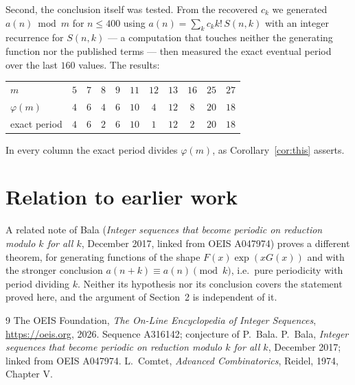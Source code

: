 \documentclass[11pt,a4paper]{article}
\theoremstyle{plain}
\theoremstyle{definition}
\begin{document}
Second, the conclusion itself was tested. From the recovered $c_{k}$ we generated
$a(n)\bmod m$ for $n\le400$ using $a(n)=\sum_{k}c_{k}k!\,S(n,k)$ with an integer
recurrence for $S(n,k)$ --- a computation that touches neither the generating function nor
the published terms --- then measured the exact eventual period over the last $160$
values. The results:

\begin{center}
\begin{tabular}{@{}lcccccccccc@{}}
\toprule
$m$  & $5$ & $7$ & $8$ & $9$ & $11$ & $12$ & $13$ & $16$ & $25$ & $27$\\
$\varphi(m)$  & $4$ & $6$ & $4$ & $6$ & $10$ & $4$ & $12$ & $8$ & $20$ & $18$\\
exact period  & $4$ & $6$ & $2$ & $6$ & $10$ & $1$ & $12$ & $2$ & $20$ & $18$\\
\bottomrule
\end{tabular}
\end{center}

\noindent
In every column the exact period divides $\varphi(m)$, as Corollary~\ref{cor:this}
asserts.

\section{Relation to earlier work}

A related note of Bala (\emph{Integer sequences that become periodic on reduction modulo
$k$ for all $k$}, December 2017, linked from OEIS A047974) proves a different theorem, for
generating functions of the shape $F(x)\exp(xG(x))$ and with the stronger conclusion
$a(n+k)\equiv a(n)\pmod{k}$, i.e.\ pure periodicity with period dividing $k$. Neither its
hypothesis nor its conclusion covers the statement proved here, and the argument of
Section~2 is independent of it.

\begin{thebibliography}{9}
 The OEIS Foundation, \emph{The On-Line Encyclopedia of Integer Sequences},
\url{https://oeis.org}, 2026. Sequence A316142; conjecture of P.\ Bala.
 P.\ Bala, \emph{Integer sequences that become periodic on reduction modulo
$k$ for all $k$}, December 2017; linked from OEIS A047974.
 L.\ Comtet, \emph{Advanced Combinatorics}, Reidel, 1974, Chapter V.
\end{thebibliography}
\end{document}
